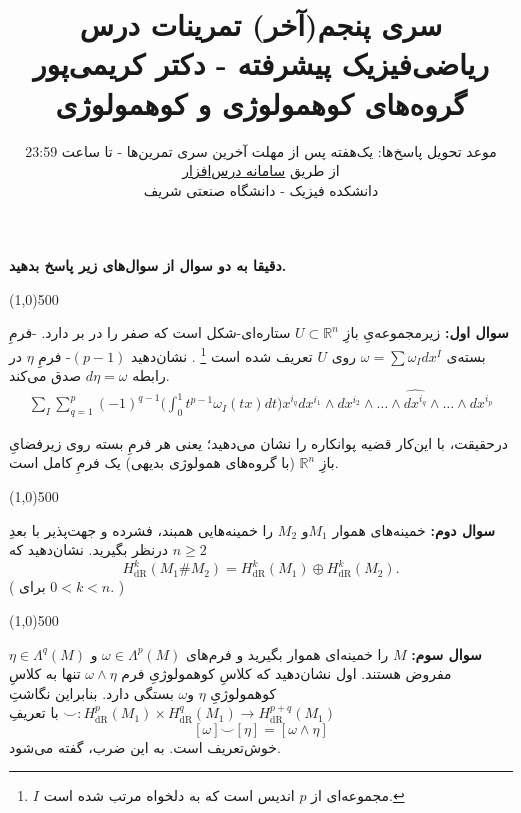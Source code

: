 \documentclass{article}
\title{ سری پنجم(آخر) تمرینات درس ریاضی‌فیزیک پیشرفته - دکتر کریمی‌پور
	\\
	\vspace{-1em}
	{\Large
		گروه‌های کوهمولوژی و کوهمولوژی
		\lr{De-Rham}
		}
		\\
		
}
\author{موعد تحویل پاسخ‌ها:
	یک‌هفته پس از مهلت آخرین سری تمرین‌ها - تا ساعت 23:59
	\\
	از طریق 
	\href{https://cw.sharif.edu/}{سامانه درس‌افزار}
	\\
	دانشکده فیزیک - دانشگاه صنعتی شریف
}\date{}
\begin{document}
	\maketitle
	
	\def\endline{		{
			\vspace{-2.5em}
			\color{cyan}
			\begin{center} \linethickness{1mm}\line(1,0){500} \end{center}
	}}
	\def\thinendline{		{
			\vspace{-2.5em}
			\color{purple}
			\begin{center} \linethickness{0.5mm}\line(1,0){500} \end{center}
	}}
\textbf{
دقیقا به دو سوال از سوال‌های زیر پاسخ بدهید.
}
	\vspace{-1.5em}
	\endline

	\vspace{-3em}
	\noindent
	\textbf{سوال اول:}
		زیرمجموعه‌یِ بازِ
		$ U \subset \mathbb{R}^n$
		 ستاره‌ای-شکل
		است که صفر را در بر دارد. 
		-فرمِ بسته‌ی 
		$\omega = \sum \omega_I dx^I$
		روی $U$ تعریف شده است
		\footnote{$I$ مجموعه‌ای از $p$ اندیس است که به دلخواه مرتب شده است.}
		. 
		نشان‌دهید 
		$(p-1)$- فرمِ
		$\eta$ در رابطه
		$d\eta = \omega$
		صدق می‌کند.
		\begin{equation*}
			\begin{aligned}
				\sum_I \sum_{q=1}^{p} (-1)^{q-1} \Big(
				\int_0^1 t^{p-1} \omega_I(tx) dt\Big) x^{i_q} dx^{i_1} \wedge dx^{i_2}\wedge\dots\wedge \widehat{dx^{i_q}} \wedge\dots \wedge dx^{i_p}
			\end{aligned}
		\end{equation*}

	درحقیقت، با این‌کار قضیه پوانکاره را نشان می‌دهید؛ یعنی هر فرمِ بسته روی زیرفضایِ بازِ 
	$\mathbb{R}^n$
	(با گروه‌های همولوژی بدیهی)
	یک فرمِ کامل است. 
	\vspace{-3em}
	\endline
	
	\vspace{-3em}
	\textbf{سوال دوم:}
	خمینه‌های هموار
	$M_1$و $M_2$ را خمینه‌هایی همبند، فشرده و جهت‌پذیر با بعدِ $n\geq 2$ درنظر بگیرید.
	نشان‌دهید که 
	\[H^k_{\text{dR}}(M_1\# M_2) = H^k_{\text{dR}}(M_1) \oplus H^k_{\text{dR}}(M_2).\]
	(
	برای
	$0<k<n$.
	)
	
	\vspace{-1em}
	\endline
	
	\vspace{-1em}
	\noindent
	\textbf{سوال سوم:}
	$M$ را خمینه‌ای هموار بگیرید و
	فرم‌های 
	$\omega \in \Lambda^p(M)$
	و
	$\eta \in \Lambda^q(M)$
	 مفروض هستند.
	 اول نشان‌دهید که کلاسِ کوهمولوژیِ فرم 
	 $\omega \wedge \eta$
	  تنها به کلاسِ کوهمولوژیِ 
	  $\eta$ و‌$\omega$
	   بستگی دارد.  بنابراین نگاشتِ 
	    $\smile : H^p_{\text{dR}}(M_1) \times H^q_{\text{dR}}(M_1) \xrightarrow{\quad} H^{p+q}_{\text{dR}}(M_1)$
	    با تعریفِ
	    \newpage
	    \[
	    [\omega] \smile [\eta] = [\omega \wedge \eta]
	    \]
	    خوش‌تعریف است. به این ضرب، 
	    گفته می‌شود.
	    
\end{document}
